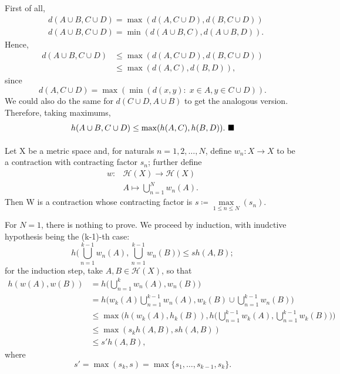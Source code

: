 \documentclass[../fractals_everywhere.tex]{subfiles}
\begin{document}
\begin{proof*}
	First of all,
	\begin{align*}
		 & d(A\cup B, C\cup D) = \max\limits_{}(d(A, C\cup D), d(B, C\cup D))  \\
		 & d(A\cup B, C\cup D) = \min\limits_{}(d(A\cup B, C), d(A\cup B, D)).
	\end{align*}
	Hence,
	\begin{align*}
		d(A\cup B, C\cup D) & \leq \max\limits_{}(d(A, C\cup D), d(B, C\cup D)) \\
		                    & \leq \max\limits_{}(d(A, C), d(B, D)),
	\end{align*}
	since
	\[
		d(A, C\cup D) = \max\limits_{}(\min\limits_{}(d(x, y):\; x\in A, y\in C\cup D)).
	\]
	We could also do the same for \(d(C\cup D, A\cup B)\) to get the analogous version. Therefore, taking maximums,
	\[
		h(A\cup B, C\cup D)\leq \max\limits_{}(h(A, C), h(B, D)). \text{ $\blacksquare$}
	\]
\end{proof*}
\begin{lemma*}
	Let X be a metric space and, for naturals \(n=1, 2, \dotsc , N\), define \(w_{n}:X\rightarrow X\) to be a contraction with contracting factor \(s_{n}\); further define
	\begin{align*}
		w: & \mathcal{H}(X)\rightarrow\mathcal{H}(X) \\
		   & A\longmapsto \bigcup_{n=1}^{N}w_{n}(A).
	\end{align*}
	Then W is a contraction whose contracting factor is \(s\coloneqq \max\limits_{1\leq n\leq N}(s_{n})\).
\end{lemma*}
\begin{proof*}
	For \(N=1\), there is nothing to prove. We proceed by induction, with inudctive hypothesis being the (k-1)-th case:
	\[
		h\biggl(\bigcup_{n=1}^{k-1}w_{n}(A), \bigcup_{n=1}^{k-1}w_{n}(B)\biggr)\leq sh(A, B);
	\]
	for the induction step, take \(A, B\in \mathcal{H}(X)\), so that
	\begin{align*}
		h(w(A), w(B)) & = h\biggl(\bigcup_{n=1}^{k}w_{n}(A), w_{n}(B)\biggr)                                                                           \\
		              & = h\biggl(w_{k}(A)\bigcup_{n=1}^{k-1}w_{n}(A), w_{k}(B)\cup \bigcup_{n=1}^{k-1}w_{n}(B)\biggr)                                 \\
		              & \leq\max\limits_{}\biggl(h(w_{k}(A), h_{k}(B)), h\biggl(\bigcup_{n=1}^{k-1}w_{k}(A), \bigcup_{n=1}^{k-1}w_{k}(B)\biggr)\biggr) \\
		              & \leq \max\limits_{}(s_{k}h(A, B), sh(A, B))                                                                                    \\
		              & \leq s'h(A, B),
	\end{align*}
	where
	\[
		s'=\max\limits_{}(s_{k}, s) = \max\limits_{}\{s_{1}, \dotsc , s_{k-1}, s_{k}\}.
	\]
\end{proof*}
\end{document}
